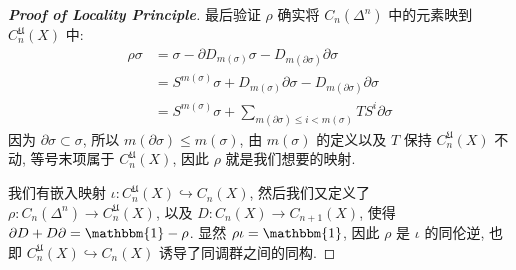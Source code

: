 \begin{proof}[{\bf Proof of Locality Principle}]
            最后验证 $\rho$ 确实将 $C_n(\Delta^n)$ 中的元素映到 $C^{\mathfrak{U}}_n(X)$ 中:
            \begin{align*}
                \rho\sigma &= \sigma - \partial D_{m(\sigma)}\sigma - D_{m(\partial\sigma)}\partial\sigma \\
                &= S^{m(\sigma)}\sigma + D_{m(\sigma)}\partial\sigma - D_{m(\partial\sigma)}\partial\sigma \\
                &= S^{m(\sigma)}\sigma + \sum_{m(\partial\sigma) \leq i < m(\sigma)}TS^i\partial\sigma 
            \end{align*}
            因为 $\partial\sigma\subset\sigma$, 所以 $m(\partial\sigma)\leq m(\sigma)$, 由 $m(\sigma)$ 的定义以及 $T$ 保持 $C^{\mathfrak{U}}_n(X)$ 不动,
            等号末项属于 $C^{\mathfrak{U}}_n(X)$, 因此 $\rho$ 就是我们想要的映射.

             我们有嵌入映射 $\iota:C^{\mathfrak{U}}_n(X)\hookrightarrow C_n(X)$, 然后我们又定义了 $\rho:C_n(\Delta^n)\rightarrow C^{\mathfrak{U}}_n(X)$, 
            以及 $D:C_n(X)\rightarrow C_{n+1}(X)$, 使得 $\partial D + D\partial = \mathbbm{1} - \rho$. 显然 $\rho\iota = \mathbbm{1}$, 因此 $\rho$ 是 $\iota$ 的同伦逆, 
            也即 $C^{\mathfrak{U}}_n(X)\hookrightarrow C_n(X)$ 诱导了同调群之间的同构.
        \end{proof}

        
 
